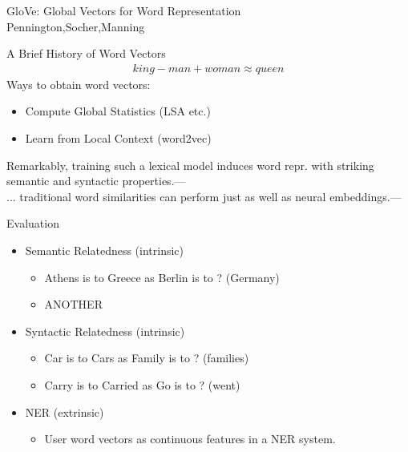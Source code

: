 \begin{frame}
  \begin{center}
    {\huge GloVe: Global Vectors for Word Representation
    } \\
    Pennington,Socher,Manning
  \end{center}
\end{frame}

\begin{frame}{A Brief History of Word Vectors}
  \begin{align*}
    king - man + woman \approx queen
  \end{align*}
  Ways to obtain word vectors:
  \begin{itemize}
  \item Compute Global Statistics (LSA etc.)
  \item Learn from Local Context (word2vec)
  \end{itemize}
  \footnotesize{Remarkably, training such a lexical model induces word repr. with striking semantic and syntactic properties.}---\cite{Mikolov13a} \\
  \footnotesize{... traditional word similarities can perform just as well as neural embeddings.}---\cite{Levy14}
\end{frame}

\begin{frame}{Evaluation}
  \begin{itemize}
  \item Semantic Relatedness (intrinsic)
    \begin{itemize}
    \item Athens is to Greece as Berlin is to ? (Germany)
    \item ANOTHER
    \end{itemize}
  \item Syntactic Relatedness (intrinsic)
    \begin{itemize}
    \item Car is to Cars as Family is to ? (families)
    \item Carry is to Carried as Go is to ? (went)
    \end{itemize}
  \item NER (extrinsic)
    \begin{itemize}
    \item User word vectors as continuous features in a NER system.
    \end{itemize}
  \end{itemize}
\end{frame}


